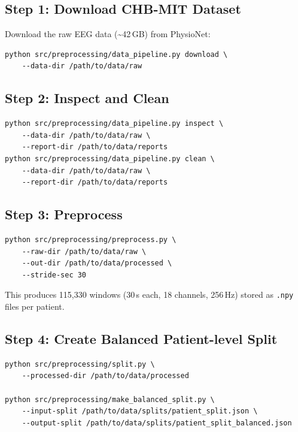 \documentclass[11pt]{article}
\begin{document}
\subsection{Step 1: Download CHB-MIT Dataset}

Download the raw EEG data (\textasciitilde42\,GB) from PhysioNet:

\begin{verbatim}
python src/preprocessing/data_pipeline.py download \
    --data-dir /path/to/data/raw
\end{verbatim}

\subsection{Step 2: Inspect and Clean}

\begin{verbatim}
python src/preprocessing/data_pipeline.py inspect \
    --data-dir /path/to/data/raw \
    --report-dir /path/to/data/reports
python src/preprocessing/data_pipeline.py clean \
    --data-dir /path/to/data/raw \
    --report-dir /path/to/data/reports
\end{verbatim}

\subsection{Step 3: Preprocess}

\begin{verbatim}
python src/preprocessing/preprocess.py \
    --raw-dir /path/to/data/raw \
    --out-dir /path/to/data/processed \
    --stride-sec 30
\end{verbatim}

This produces 115{,}330 windows (30\,s each, 18 channels, 256\,Hz) stored as \texttt{.npy} files per patient.

\subsection{Step 4: Create Balanced Patient-level Split}

\begin{verbatim}
python src/preprocessing/split.py \
    --processed-dir /path/to/data/processed

python src/preprocessing/make_balanced_split.py \
    --input-split /path/to/data/splits/patient_split.json \
    --output-split /path/to/data/splits/patient_split_balanced.json
\end{verbatim}
\end{document}
